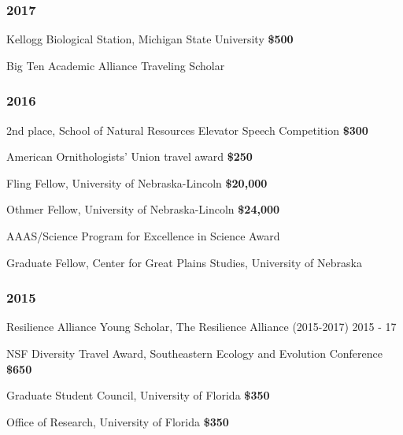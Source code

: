 \documentclass[11pt,]{article}
\providecommand{\tightlist}{%
  \setlength{\itemsep}{0pt}\setlength{\parskip}{0pt}}
\renewenvironment{itemize}{
 \begin{list}{- }{
   \setlength{\leftmargin}{1.5em}
   \setlength{\itemsep}{0pt}
 }
}{
 \end{list}
}
\begin{document}
\hypertarget{section-3}{%
\subsubsection{2017}\label{section-3}}

\begin{itemize}
\tightlist
\item
  Kellogg Biological Station, Michigan State University
  \hfill \textbf{\$500}
\item
  Big Ten Academic Alliance Traveling Scholar
\end{itemize}

\hypertarget{section-4}{%
\subsubsection{2016}\label{section-4}}

\begin{itemize}
\tightlist
\item
  2nd place, School of Natural Resources Elevator Speech Competition
  \hfill \textbf{\$300}
\item
  American Ornithologists' Union travel award \hfill \textbf{\$250}
\item
  Fling Fellow, University of Nebraska-Lincoln \hfill \textbf{\$20,000}
\item
  Othmer Fellow, University of Nebraska-Lincoln \hfill \textbf{\$24,000}
\item
  AAAS/Science Program for Excellence in Science Award
\item
  Graduate Fellow, Center for Great Plains Studies, University of
  Nebraska
\end{itemize}

\hypertarget{section-5}{%
\subsubsection{2015}\label{section-5}}

\begin{itemize}
\tightlist
\item
  Resilience Alliance Young Scholar, The Resilience Alliance (2015-2017)
  \hfill 2015 - 17
\item
  NSF Diversity Travel Award, Southeastern Ecology and Evolution
  Conference \hfill \textbf{\$650}
\item
  Graduate Student Council, University of Florida \hfill \textbf{\$350}
\item
  Office of Research, University of Florida \hfill \textbf{\$350}
\end{itemize}
\end{document}
